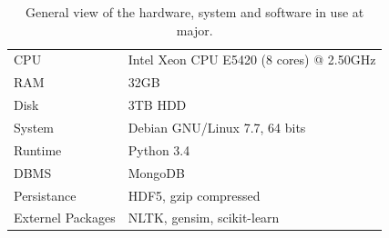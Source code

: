 \begin{table}[!htb]
\begin{tabular}{ll}
CPU & Intel Xeon CPU E5420 (8 cores) @ 2.50GHz \\
RAM & 32GB \\ 
Disk & 3TB HDD \\ 
System & Debian GNU/Linux 7.7, 64 bits \\ 
Runtime & Python 3.4 \\
DBMS & MongoDB \\ 
Persistance & HDF5, gzip compressed \\
Externel Packages & NLTK, gensim, scikit-learn \\
\end{tabular}
\caption{General view of the hardware, system and software in use at major. }
\label{tab:pcinfo}
\end{table}


